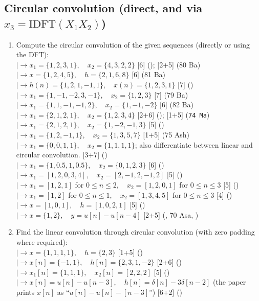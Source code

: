 \documentclass[12pt]{article}
\newcommand{\lb}{\\$\left|\rightarrow\right.$}
\begin{document}
  \subsection{Circular convolution (direct, and via $x_3=\mathrm{IDFT}(X_1X_2)$)}
    \begin{enumerate}[topsep=0pt, noitemsep]
      \item Compute the circular convolution of the given sequences (directly or using the DFT):
        \lb $x_1=\{1,2,3,1\},\quad x_2=\{4,3,2,2\}$ \hfill [6] (); [2+5] (80 Ba)
        \lb $x=\{1,2,4,5\},\quad h=\{2,1,6,8\}$ \hfill [6] (81 Ba)
        \lb $h(n)=\{1,2,1,-1,1\},\quad x(n)=\{1,2,3,1\}$ \hfill [7] ()
        \lb $x_1=\{1,-1,-2,3,-1\},\quad x_2=\{1,2,3\}$ \hfill [7] (79 Ba)
        \lb $x_1=\{1,1,-1,-1,2\},\quad x_2=\{1,-1,-2\}$ \hfill [6] (82 Ba)
        \lb $x_1=\{2,1,2,1\},\quad x_2=\{1,2,3,4\}$ \hfill [2+6] (); [1+5] (\texttt{74 Ma})
        \lb $x_1=\{2,1,2,1\},\quad x_2=\{1,-2,-1,3\}$ \hfill [5] ()
        \lb $x_1=\{1,2,-1,1\},\quad x_2=\{1,3,5,7\}$ \hfill [1+5] (75 Ash)
        \lb $x_1=\{0,0,1,1\},\quad x_2=\{1,1,1,1\}$; also differentiate between linear and circular convolution. \hfill [3+7] ()
        \lb $x_1=\{1,0.5,1,0.5\},\quad x_2=\{0,1,2,3\}$ \hfill [6] ()
        \lb $x_1=[1,2,0,3,4],\quad x_2=[2,-1,2,-1,2]$ \hfill [5] ()
        \lb $x_1=[1,2,1]$ for $0\le n\le2,\quad x_2=[1,2,0,1]$ for $0\le n\le3$ \hfill [5] ()
        \lb $x_1=[1,2]$ for $0\le n\le1,\quad x_2=[1,3,4,5]$ for $0\le n\le3$ \hfill [4] ()
        \lb $x=[1,0,1],\quad h=[1,0,2,1]$ \hfill [5] ()
        \lb $x=\{1,2\},\quad y=u[n]-u[n-4]$ \hfill [2+5] (, 70 Asa, )

      \item Find the linear convolution through circular convolution (with zero padding where required):
        \lb $x=\{1,1,1,1\},\quad h=\{2,3\}$ \hfill [1+5] ()
        \lb $x[n]=\{-1,1\},\quad h[n]=\{2,3,1,-2\}$ \hfill [2+6] ()
        \lb $x_1[n]=\{1,1,1\},\quad x_2[n]=[2,2,2]$ \hfill [5] ()
        \lb $x[n]=u[n]-u[n-3],\quad h[n]=\delta[n]-3\delta[n-2]$ (the paper prints $x[n]$ as ``$u[n]-u[n]-[n-3]$'') \hfill [6+2] ()


\end{enumerate}
\end{document}
